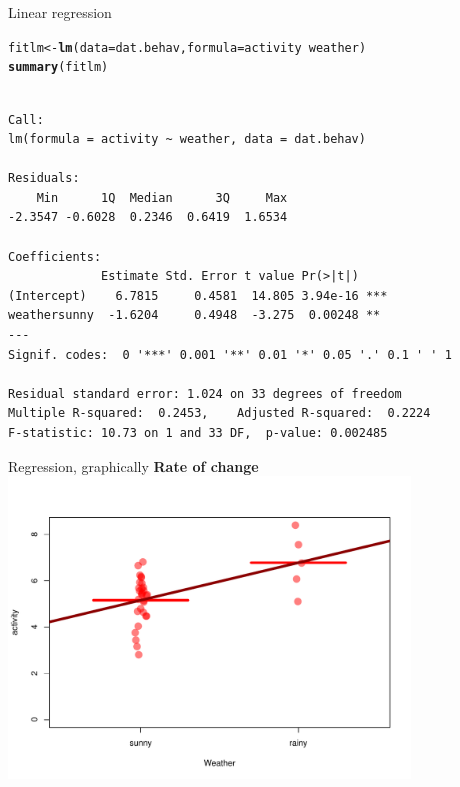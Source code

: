 \documentclass[10pt]{beamer}\usepackage[]{graphicx}\usepackage[]{color}
\makeatletter
\newcommand{\hlopt}[1]{\textcolor[rgb]{0,0,0}{#1}}%
\newcommand{\hlstd}[1]{\textcolor[rgb]{0.345,0.345,0.345}{#1}}%
\newcommand{\hlkwb}[1]{\textcolor[rgb]{0.69,0.353,0.396}{#1}}%
\newcommand{\hlkwc}[1]{\textcolor[rgb]{0.333,0.667,0.333}{#1}}%
\newcommand{\hlkwd}[1]{\textcolor[rgb]{0.737,0.353,0.396}{\textbf{#1}}}%
\newenvironment{kframe}{%
 \def\at@end@of@kframe{}%
 \ifinner\ifhmode%
  \def\at@end@of@kframe{\end{minipage}}%
  \begin{minipage}{\columnwidth}%
 \fi\fi%
 \def\FrameCommand##1{\hskip\@totalleftmargin \hskip-\fboxsep
 \colorbox{shadecolor}{##1}\hskip-\fboxsep
     \hskip-\linewidth \hskip-\@totalleftmargin \hskip\columnwidth}%
 \MakeFramed {\advance\hsize-\width
   \@totalleftmargin\z@ \linewidth\hsize
   \@setminipage}}%
 {\par\unskip\endMakeFramed%
 \at@end@of@kframe}
\newenvironment{knitrout}{}{} %
\makeatother
\begin{document}
\begin{frame}[fragile]{Linear regression}

\begin{knitrout}
\color{fgcolor}\begin{kframe}
\begin{alltt}
\hlstd{fitlm} \hlkwb{<-} \hlkwd{lm}\hlstd{(}\hlkwc{data} \hlstd{= dat.behav,} \hlkwc{formula} \hlstd{= activity} \hlopt{~} \hlstd{weather)}
\hlkwd{summary}\hlstd{(fitlm)}
\end{alltt}
\begin{verbatim}

Call:
lm(formula = activity ~ weather, data = dat.behav)

Residuals:
    Min      1Q  Median      3Q     Max 
-2.3547 -0.6028  0.2346  0.6419  1.6534 

Coefficients:
             Estimate Std. Error t value Pr(>|t|)    
(Intercept)    6.7815     0.4581  14.805 3.94e-16 ***
weathersunny  -1.6204     0.4948  -3.275  0.00248 ** 
---
Signif. codes:  0 '***' 0.001 '**' 0.01 '*' 0.05 '.' 0.1 ' ' 1

Residual standard error: 1.024 on 33 degrees of freedom
Multiple R-squared:  0.2453,	Adjusted R-squared:  0.2224 
F-statistic: 10.73 on 1 and 33 DF,  p-value: 0.002485
\end{verbatim}
\end{kframe}
\end{knitrout}
\end{frame}

\begin{frame}[fragile]{Regression, graphically}
\textbf{Rate of change}
\centering
\begin{knitrout}
\color{fgcolor}
\includegraphics[width=0.8\textwidth,height=0.6\textwidth]{figure/unnamed-chunk-19-1} 

\end{knitrout}
\end{frame}
\end{document}
